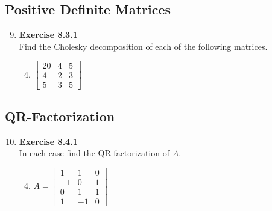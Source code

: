 \documentclass[12pt, a4paper]{scrartcl}
\begin{document}
    \subsection*{Positive Definite Matrices}
        \begin{enumerate}
            \setcounter{enumi}{8}
            \item \textbf{Exercise 8.3.1}\\Find the Cholesky decomposition of each of the following matrices.
            \begin{enumerate}
                \setcounter{enumii}{3}
                \item $\begin{bmatrix}
                    20 & 4 & 5\\
                    4 & 2 & 3\\
                    5 & 3 & 5
                \end{bmatrix}$

            \end{enumerate}
        \end{enumerate}

    \subsection*{QR-Factorization}
        \begin{enumerate}
            \setcounter{enumi}{9}
            \item \textbf{Exercise 8.4.1}\\In each case find the QR-factorization of $A$.
            \begin{enumerate}
                \setcounter{enumii}{3}
                \item $A = \begin{bmatrix}
                    1 & 1 & 0\\
                    -1 & 0 & 1\\
                    0 & 1 & 1\\
                    1 & -1 & 0
                \end{bmatrix}$

            \end{enumerate}
        \end{enumerate}
\end{document}
